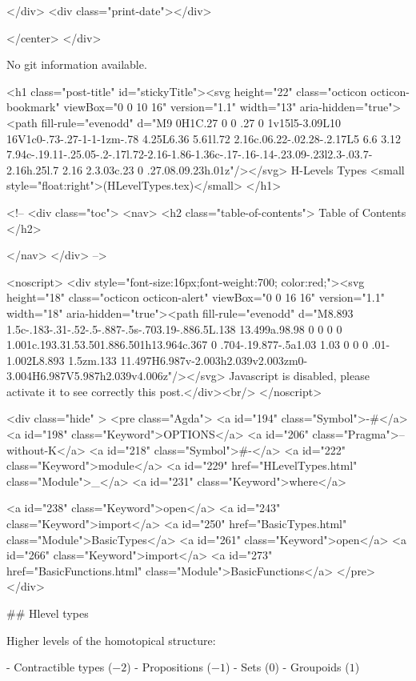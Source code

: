           
        </div>
        <div class="print-date"></div>
        
        
    </center>
  </div>

  
  No git information available.
  

  <h1 class="post-title" id="stickyTitle"><svg height="22" class="octicon octicon-bookmark" viewBox="0 0 10 16" version="1.1" width="13" aria-hidden="true"><path fill-rule="evenodd" d="M9 0H1C.27 0 0 .27 0 1v15l5-3.09L10 16V1c0-.73-.27-1-1-1zm-.78 4.25L6.36 5.61l.72 2.16c.06.22-.02.28-.2.17L5 6.6 3.12 7.94c-.19.11-.25.05-.2-.17l.72-2.16-1.86-1.36c-.17-.16-.14-.23.09-.23l2.3-.03.7-2.16h.25l.7 2.16 2.3.03c.23 0 .27.08.09.23h.01z"/></svg> H-Levels Types <small style="float:right">(HLevelTypes.tex)</small>
  </h1>

  <!-- 
  <div class="toc">
    <nav>
    <h2 class="table-of-contents"> Table of Contents </h2>
      

    </nav>
  </div>
   -->

  <noscript>
  <div style="font-size:16px;font-weight:700; color:red;"><svg height="18" class="octicon octicon-alert" viewBox="0 0 16 16" version="1.1" width="18" aria-hidden="true"><path fill-rule="evenodd" d="M8.893 1.5c-.183-.31-.52-.5-.887-.5s-.703.19-.886.5L.138 13.499a.98.98 0 0 0 0 1.001c.193.31.53.501.886.501h13.964c.367 0 .704-.19.877-.5a1.03 1.03 0 0 0 .01-1.002L8.893 1.5zm.133 11.497H6.987v-2.003h2.039v2.003zm0-3.004H6.987V5.987h2.039v4.006z"/></svg> Javascript is disabled, please activate it to see correctly this post.</div><br/>
  </noscript>

  <div class="hide" >
<pre class="Agda">
<a id="194" class="Symbol">{-#</a> <a id="198" class="Keyword">OPTIONS</a> <a id="206" class="Pragma">--without-K</a> <a id="218" class="Symbol">#-}</a>
<a id="222" class="Keyword">module</a> <a id="229" href="HLevelTypes.html" class="Module">_</a> <a id="231" class="Keyword">where</a>

<a id="238" class="Keyword">open</a> <a id="243" class="Keyword">import</a> <a id="250" href="BasicTypes.html" class="Module">BasicTypes</a>
<a id="261" class="Keyword">open</a> <a id="266" class="Keyword">import</a> <a id="273" href="BasicFunctions.html" class="Module">BasicFunctions</a>
</pre>
</div>


## Hlevel types

Higher levels of the homotopical structure:

- Contractible types ($-2$)
- Propositions ($-1$)
- Sets ($0$)
- Groupoids ($1$)

